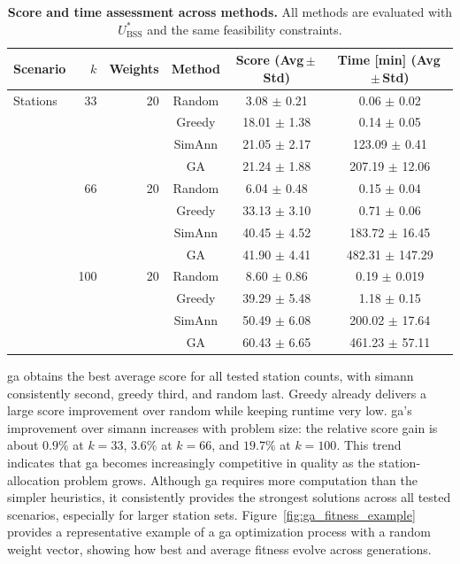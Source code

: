   \begin{table}[!htbp]
    \centering
    \caption[Score and time assessment across methods]{
        \textbf{Score and time assessment across methods.}
        All methods are evaluated with \(U_{\mathrm{BSS}}^*\) and the same feasibility constraints.
    }
    \label{table:ga_baseline_comparison}
    \footnotesize
    \begin{tabular}{l r r c c c}
    \toprule
    \textbf{Scenario} & \textbf{\(k\)} & \textbf{Weights}
        & \textbf{Method} & \textbf{Score (Avg\,$\pm$\,Std)} & \textbf{Time [min] (Avg\,$\pm$\,Std)} \\
    \midrule
    Stations & 33 & 20 & Random & 3.08 \(\pm\) 0.21 & 0.06 \(\pm\) 0.02 \\
             &    &    & Greedy & 18.01 \(\pm\) 1.38 & 0.14 \(\pm\) 0.05 \\
             &    &    & SimAnn & 21.05 \(\pm\) 2.17 & 123.09 \(\pm\) 0.41 \\
             &    &    & GA & 21.24 \(\pm\) 1.88 & 207.19 \(\pm\) 12.06 \\
    \midrule
             & 66 & 20 & Random & 6.04 \(\pm\) 0.48 & 0.15 \(\pm\) 0.04 \\
             &    &    & Greedy & 33.13 \(\pm\) 3.10 & 0.71 \(\pm\) 0.06 \\
             &    &    & SimAnn & 40.45 \(\pm\) 4.52 & 183.72 \(\pm\) 16.45 \\
             &    &    & GA & 41.90 \(\pm\) 4.41 & 482.31 \(\pm\) 147.29 \\
    \midrule
             & 100 & 20  & Random & 8.60 \(\pm\) 0.86 & 0.19 \(\pm\) 0.019 \\
              &     &    & Greedy & 39.29 \(\pm\) 5.48 & 1.18 \(\pm\) 0.15 \\
              &     &    & SimAnn & 50.49 \(\pm\) 6.08 & 200.02 \(\pm\) 17.64 \\
              &     &    & GA & 60.43 \(\pm\) 6.65 & 461.23 \(\pm\) 57.11 \\
    \bottomrule
    \end{tabular}
    \end{table}
  
  \ac{ga} obtains the best average score for all tested station counts, with \ac{simann} consistently second, greedy third, and random last. Greedy already delivers a large score improvement over random while keeping runtime very low. \ac{ga}'s improvement over \ac{simann} increases with problem size: the relative score gain is about \(0.9\%\) at \(k=33\), \(3.6\%\) at \(k=66\), and \(19.7\%\) at \(k=100\). This trend indicates that \ac{ga} becomes increasingly competitive in quality as the station-allocation problem grows. Although \ac{ga} requires more computation than the simpler heuristics, it consistently provides the strongest solutions across all tested scenarios, especially for larger station sets. Figure~\ref{fig:ga_fitness_example} provides a representative example of a \ac{ga} optimization process with a random weight vector, showing how best and average fitness evolve across generations.

